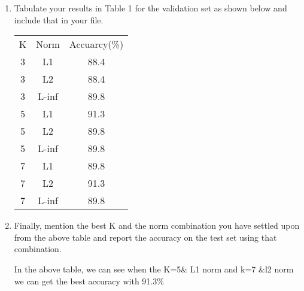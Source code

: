 \documentclass[a4paper]{article}
\begin{document}
\begin{enumerate}
\begin{enumerate}
			\item
			Tabulate your results in Table 1 for the validation set as shown below and include that in your file.
			\begin{center}
			\begin{tabular}{ccc}
				\hline
				K&Norm&Accuarcy(\%)\\
				3&L1&88.4\\
				3&L2&88.4\\
				3&L-inf&89.8\\
				\hline
				5&L1&91.3\\
				5&L2&89.8\\
				5&L-inf&89.8\\
				\hline
				7&L1&89.8\\
				7&L2&91.3\\
				7&L-inf&89.8\\
				\hline
			\end{tabular}
			\end{center}
			\item
			Finally, mention the best K and the norm combination you have settled upon from the above table and report the accuracy on the test set using that combination.
			\begin{solution}
				In the above table, we can see when the K=5\& L1 norm and k=7 \&l2 norm we can get the best accuracy with 91.3\%
			\end{solution}
		\end{enumerate}
		
	\end{enumerate}
\end{document}
